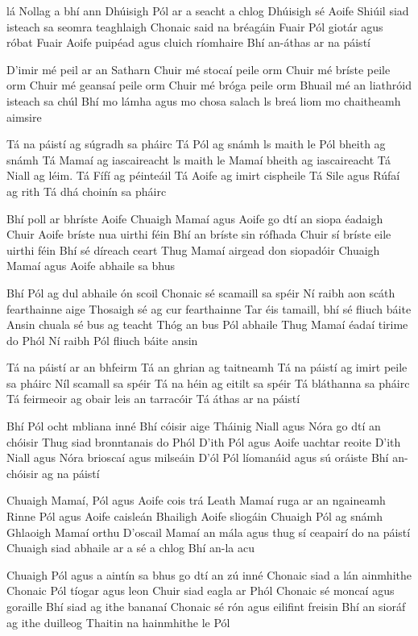 lá Nollag a bhí ann
Dhúisigh Pól ar a seacht a chlog
Dhúisigh sé Aoife
Shiúil siad isteach sa seomra teaghlaigh
Chonaic said na bréagáin
Fuair Pól giotár agus róbat
Fuair Aoife puipéad agus cluich ríomhaire
Bhí an-áthas ar na páistí

D’imir mé peil ar an Satharn
Chuir mé stocaí peile orm
Chuir mé bríste peile orm
Chuir mé geansaí peile orm
Chuir mé bróga peile orm
Bhuail mé an liathróid isteach sa chúl
Bhí mo lámha agus mo chosa salach
ls breá liom mo chaitheamh aimsire

Tá na páistí ag súgradh sa pháirc
Tá Pól ag snámh
ls maith le Pól bheith ag snámh
Tá Mamaí ag iascaireacht
ls maith le Mamaí bheith ag iascaireacht
Tá Niall ag léim.  Tá Fífí ag péinteáil
Tá Aoife ag imirt cispheile
Tá Sile agus Rúfaí ag rith
Tá dhá choinín sa pháirc

 Bhí poll ar bhríste Aoife
Chuaigh Mamaí agus Aoife go dtí an siopa éadaigh
Chuir Aoife bríste nua uirthi féin
Bhí an bríste sin rófhada
Chuir sí bríste eile uirthi féin
Bhí sé díreach ceart
Thug Mamaí airgead don siopadóir
Chuaigh Mamaí agus Aoife abhaile sa bhus

 Bhí Pól ag dul abhaile ón scoil
Chonaic sé scamaill sa spéir
Ní raibh aon scáth fearthainne aige
Thosaigh sé ag cur fearthainne
Tar éis tamaill, bhí sé fliuch báite
Ansin chuala sé bus ag teacht
Thóg an bus Pól abhaile
Thug Mamaí éadaí tirime do Phól
Ní raibh Pól fliuch báite ansin

Tá na páistí ar an bhfeirm
Tá an ghrian ag taitneamh
Tá na páistí ag imirt peile sa pháirc
Níl scamall sa spéir
Tá na héin ag eitilt sa spéir
Tá bláthanna sa pháirc
Tá feirmeoir ag obair leis an tarracóir
Tá áthas ar na páistí

Bhí Pól ocht mbliana inné
Bhí cóisir aige
 Tháinig Niall agus Nóra go dtí an chóisir
Thug siad bronntanais do Phól
D’ith Pól agus Aoife uachtar reoite
D’ith Niall agus Nóra brioscaí agus milseáin
D’ól Pól líomanáid agus sú oráiste
Bhí an-chóisir ag na páistí


Chuaigh Mamaí, Pól agus Aoife cois trá
Leath Mamaí ruga ar an ngaineamh
Rinne Pól agus Aoife caisleán
Bhailigh Aoife sliogáin
Chuaigh Pól ag snámh
Ghlaoigh Mamaí orthu
D’oscail Mamaí an mála agus thug sí ceapairí do na páistí
Chuaigh siad abhaile ar a sé a chlog
Bhí an-la acu

Chuaigh Pól agus a aintín sa bhus go dtí an zú inné
Chonaic siad a lán ainmhithe
Chonaic Pól tíogar agus leon
Chuir siad eagla ar Phól
Chonaic sé moncaí agus goraille
Bhí siad ag ithe bananaí
Chonaic sé rón agus eilifint freisin
Bhí an sioráf ag ithe duilleog
Thaitin na hainmhithe le Pól


  

